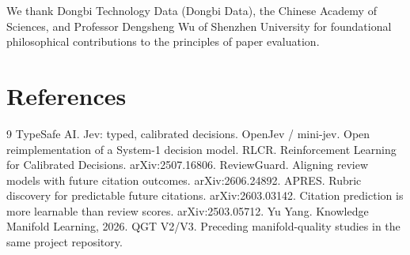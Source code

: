 \documentclass[11pt]{article}
\begin{document}
We thank Dongbi Technology Data (Dongbi Data), the Chinese Academy of Sciences,
and Professor Dengsheng Wu of Shenzhen University for foundational
philosophical contributions to the principles of paper evaluation.

\section*{References}

\begin{thebibliography}{9}
 TypeSafe AI. Jev: typed, calibrated decisions.
 OpenJev / mini-jev. Open reimplementation of a System-1 decision model.
 RLCR. Reinforcement Learning for Calibrated Decisions. arXiv:2507.16806.
 ReviewGuard. Aligning review models with future citation outcomes. arXiv:2606.24892.
 APRES. Rubric discovery for predictable future citations. arXiv:2603.03142.
 Citation prediction is more learnable than review scores. arXiv:2503.05712.
 Yu Yang. Knowledge Manifold Learning, 2026.
 QGT V2/V3. Preceding manifold-quality studies in the same project repository.
\end{thebibliography}
\end{document}
